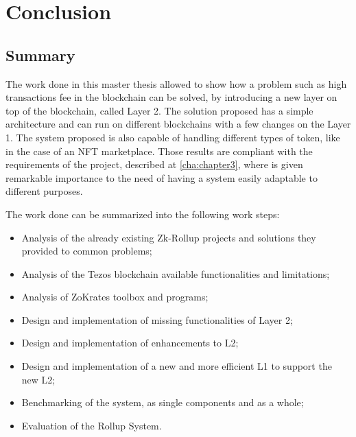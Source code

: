\chapter{Conclusion\label{cha:chapter7}}

\section{Summary\label{sec:summary}}

The work done in this master thesis allowed to show how a problem such as high transactions fee in the blockchain can be solved, by introducing a new layer on top of the blockchain, called Layer 2. The solution proposed has a simple architecture and can run on different blockchains with a few changes on the Layer 1. The system proposed is also capable of handling different types of token, like in the case of an NFT marketplace. Those results are compliant with the requirements of the project, described at \ref{cha:chapter3}, where is given remarkable importance to the need of having a system easily adaptable to different purposes.

\noindent The work done can be summarized into the following work steps:
\vspace{-0.11in}
\begin{itemize}
	\item Analysis of the already existing Zk-Rollup projects and solutions they provided to common problems;
	      \vspace{-0.11in}
	\item Analysis of the Tezos blockchain available functionalities and limitations;
	      \vspace{-0.11in}
	\item Analysis of ZoKrates toolbox and programs;
	      \vspace{-0.11in}
	\item Design and implementation of missing functionalities of Layer 2;
	      \vspace{-0.11in}
	\item Design and implementation of enhancements to L2;
	      \vspace{-0.11in}
	\item Design and implementation of a new and more efficient L1 to support the new L2;
	      \vspace{-0.11in}
	\item Benchmarking of the system, as single components and as a whole;
	      \vspace{-0.11in}
	\item Evaluation of the Rollup System.
\end{itemize}

